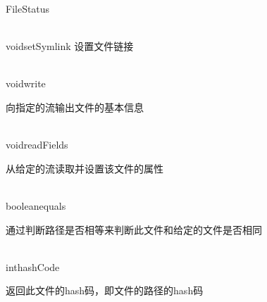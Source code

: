 \begin{XeClass}{FileStatus}
\begin{XeMethod}{\XePublic\\ }{void}{setSymlink}
 设置文件链接

  \end{XeMethod}

  \begin{XeMethod}{\XePublic\\ }{void}{write}
       
 向指定的流输出文件的基本信息

  \end{XeMethod}

  \begin{XeMethod}{\XePublic\\ }{void}{readFields}
       
 从给定的流读取并设置该文件的属性

  \end{XeMethod}

  \begin{XeMethod}{\XePublic\\ }{boolean}{equals}
       
 通过判断路径是否相等来判断此文件和给定的文件是否相同

  \end{XeMethod}

  \begin{XeMethod}{\XePublic\\ }{int}{hashCode}
       
 返回此文件的hash码，即文件的路径的hash码

  \end{XeMethod}

\end{XeClass}
